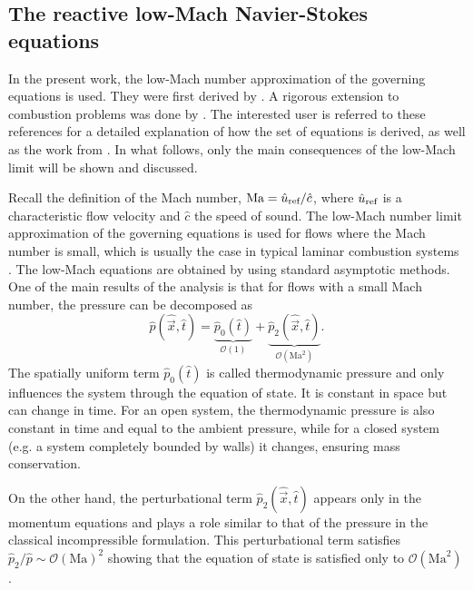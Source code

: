 \subsection{The reactive low-Mach Navier-Stokes equations} \label{ssec:NonDimLowMachEquations}

In the present work, the low-Mach number approximation of the governing equations is used.  They were first derived by \textcite{rehmEquationsMotionThermally1978}. A rigorous extension to combustion problems was done by \textcite{majdaDerivationNumericalSolution1985}. The interested user is referred to these references for a detailed explanation of how the set of equations is derived, as well as the work from \textcite{mullerLowMachNumberAsymptoticsNavierStokes1998}. In what follows, only the main consequences of the low-Mach limit will be shown and discussed.

Recall the definition of the Mach number, $\text{Ma} = \hat u_{\text{ref}}/\hat c$, where $\hat u_{\text{ref}}$ is a characteristic flow velocity and $\hat{c}$ the speed of sound. The low-Mach number limit approximation of the governing equations is used for flows where the Mach number is small, which is usually the case in typical laminar combustion systems \parencite{dobbinsFullyImplicitCompact2010}.
The low-Mach equations are obtained by using standard asymptotic methods. One of the main results of the analysis is that for flows with a small Mach number, the pressure can be decomposed as
\begin{equation}
	\hat p(\hat {\vec{x}}, \hat t) = \underbrace{\hat p_0(\hat t)}_{\mathcal{O}(1)} + \underbrace{\hat p_2(\hat{\vec{x}},\hat t)}_{\mathcal{O}(\text{Ma}^2)} .
\end{equation}
The spatially uniform term $\hat p_0(\hat t)$ is called thermodynamic pressure and only influences the system through the equation of state. It is constant in space but can change in time.  For an open system, the thermodynamic pressure is also constant in time and equal to the ambient pressure, while for a closed system (e.g. a system completely bounded by walls) it changes, ensuring mass conservation. 

On the other hand, the perturbational term $\hat p_2(\hat{\vec{x}},\hat t)$ appears only in the momentum equations and plays a role similar to that of the pressure in the classical incompressible formulation. This perturbational term satisfies $\hat p_2/\hat p \sim \mathcal{O}(\text{Ma})^2$ \parencite{dobbinsFullyImplicitCompact2010,nonakaConservativeThermodynamicallyConsistent2018} showing that the equation of state is satisfied only to $\mathcal{O}(\text{Ma}^2)$.

